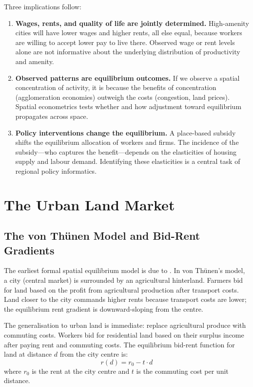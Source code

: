 Three implications follow:

\begin{enumerate}
  \item \textbf{Wages, rents, and quality of life are jointly determined.}
    High-amenity cities will have lower wages and higher rents, all else
    equal, because workers are willing to accept lower pay to live there.
    Observed wage or rent levels alone are not informative about the
    underlying distribution of productivity and amenity.

  \item \textbf{Observed patterns are equilibrium outcomes.} If we observe
    a spatial concentration of activity, it is because the benefits of
    concentration (agglomeration economies) outweigh the costs (congestion,
    land prices). Spatial econometrics tests whether and how adjustment
    toward equilibrium propagates across space.

  \item \textbf{Policy interventions change the equilibrium.} A place-based
    subsidy shifts the equilibrium allocation of workers and firms. The
    incidence of the subsidy---who captures the benefit---depends on the
    elasticities of housing supply and labour demand. Identifying these
    elasticities is a central task of regional policy informatics.
\end{enumerate}



\section{The Urban Land Market}
\label{sec_LandMarket}

\subsection{The von Thünen Model and Bid-Rent Gradients}

The earliest formal spatial equilibrium model is due to \citet{VonThunen1826}.
In von Thünen's model, a city (central market) is surrounded by an
agricultural hinterland. Farmers bid for land based on the profit from
agricultural production after transport costs. Land closer to the city
commands higher rents because transport costs are lower; the equilibrium
rent gradient is downward-sloping from the centre.

The generalisation to urban land is immediate: replace agricultural produce
with commuting costs. Workers bid for residential land based on their surplus
income after paying rent and commuting costs. The equilibrium bid-rent
function for land at distance $d$ from the city centre is:
\begin{equation}
  r(d) = r_0 - t \cdot d
\end{equation}
where $r_0$ is the rent at the city centre and $t$ is the commuting cost per
unit distance.


